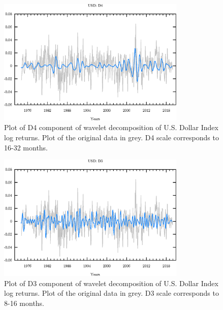 \begin{figure}
\begin{center}
\includegraphics[width=0.8\textwidth]{./code/plot/usd_wr_D4.eps}
\caption{Plot of D4 component of wavelet decomposition of U.S. Dollar Index log returns. 
	Plot of the original data in grey. D4 scale corresponds to 16-32 months.}
\label{fig:usd-wr-d4}
\end{center}
\end{figure}

\begin{figure}
\begin{center}
\includegraphics[width=0.8\textwidth]{./code/plot/usd_wr_D3.eps}
\caption{Plot of D3 component of wavelet decomposition of U.S. Dollar Index log returns. 
	Plot of the original data in grey. D3 scale corresponds to 8-16 months.}
\label{fig:usd-wr-d3}
\end{center}
\end{figure}

